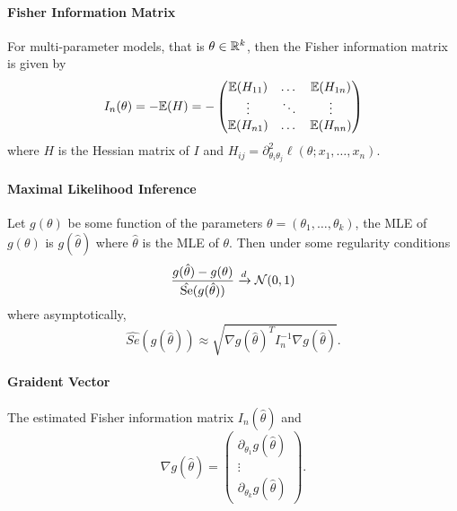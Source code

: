 \paragraph{Fisher Information Matrix}
For multi-parameter models, that is \(\theta \in \mathbb{R}^k\), then the Fisher information matrix is given by
\[I_n(\theta) = -\mathbb{E}(H) = -\begin{pmatrix}
    \mathbb{E}(H_{11}) & \dots & \mathbb{E}(H_{1n}) \\
    \vdots & \ddots & \vdots \\
    \mathbb{E}(H_{n1}) & \dots & \mathbb{E}(H_{nn})
\end{pmatrix}\]
where \(H\) is the Hessian matrix of \(I\) and \(H_{ij} = \partial_{\theta_i \theta_j}^2\ell(\theta; x_1, \dots, x_n)\).

\paragraph{Maximal Likelihood Inference}
Let \(g(\theta)\) be some function of the parameters \(\theta = (\theta_1, \dots, \theta_k)\), the MLE of \(g(\theta)\) is \(g(\hat{\theta})\) where \(\hat{\theta}\) is the MLE of \(\theta\). Then under some regularity conditions
\[\frac{g(\hat{\theta}) - g(\theta)}{\hat{\mathrm{Se}}(g(\hat{\theta}))} \xrightarrow{d} \mathcal{N}(0, 1)\]
where asymptotically,
\[\hat{Se}(g(\hat{\theta})) \approx \sqrt{\nabla g(\hat{\theta})^T I_n^{-1}\nabla g(\hat{\theta})}.\]

\paragraph{Graident Vector}
The estimated Fisher information matrix \(I_n(\hat{\theta})\) and
\[\nabla g(\hat{\theta}) = \begin{pmatrix}
    \partial_{\theta_1} g(\hat{\theta}) \\
    \vdots \\
    \partial_{\theta_k} g(\hat{\theta})
\end{pmatrix}.\]